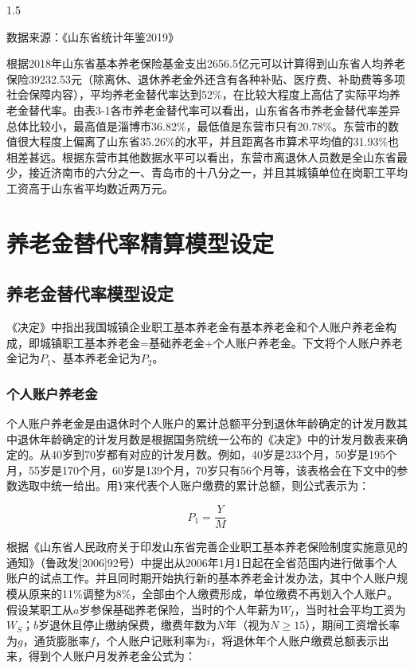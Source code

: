 \documentclass[a4paper,12pt]{ctexart}
\newcommand{\wuhao}{\fontsize{10.5pt}{15.75pt}\selectfont}
\numberwithin{equation}{section}
\begin{document}
\begin{spacing}{1.5}
\begin{table}[htbp]
\vspace{0.2cm}
{\wuhao 数据来源：《山东省统计年鉴2019》}
\end{table}

\vspace{0.3cm}

根据2018年山东省基本养老保险基金支出2656.5亿元可以计算得到山东省人均养老保险39232.53元（除离休、退休养老金外还含有各种补贴、医疗费、补助费等多项社会保障内容），平均养老金替代率达到52\%，在比较大程度上高估了实际平均养老金替代率。由表3-1各市养老金替代率可以看出，山东省各市养老金替代率差异总体比较小，最高值是淄博市36.82\%，最低值是东营市只有20.78\%。东营市的数值很大程度上偏离了山东省35.26\%的水平，并且距离各市算术平均值的31.93\%也相差甚远。根据东营市其他数据水平可以看出，东营市离退休人员数是全山东省最少，接近济南市的六分之一、青岛市的十八分之一，并且其城镇单位在岗职工平均工资高于山东省平均数近两万元。

\section{养老金替代率精算模型设定}

\subsection{养老金替代率模型设定}

《决定》中指出我国城镇企业职工基本养老金有基本养老金和个人账户养老金构成，即城镇职工基本养老金=基础养老金+个人账户养老金。下文将个人账户养老金记为$P_1$、基本养老金记为$P_2$。

\subsubsection{个人账户养老金}

个人账户养老金是由退休时个人账户的累计总额平分到退休年龄确定的计发月数其中退休年龄确定的计发月数是根据国务院统一公布的《决定》中的计发月数表来确定的。从40岁到70岁都有对应的计发月数。例如，40岁是233个月，50岁是195个月，55岁是170个月，60岁是139个月，70岁只有56个月等，该表格会在下文中的参数选取中统一给出。用$Y$来代表个人账户缴费的累计总额，则公式表示为：

\begin{equation}
P_1 = \frac{Y}{M}
\end{equation}

根据《山东省人民政府关于印发山东省完善企业职工基本养老保险制度实施意见的通知》（鲁政发[2006]92号）中提出从2006年1月1日起在全省范围内进行做事个人账户的试点工作。并且同时期开始执行新的基本养老金计发办法，其中个人账户规模从原来的11\%调整为8\%，全部由个人缴费形成，单位缴费不再划入个人账户。假设某职工从$a$岁参保基础养老保险，当时的个人年薪为$W_I$，当时社会平均工资为$W_S$；$b$岁退休且停止缴纳保费，缴费年数为$N$年（视为$N \geq 15$），期间工资增长率为$g$，通货膨胀率$f$，个人账户记账利率为$i$，将退休年个人账户缴费总额表示出来，得到个人账户月发养老金公式为：


\end{spacing}
\end{document}
